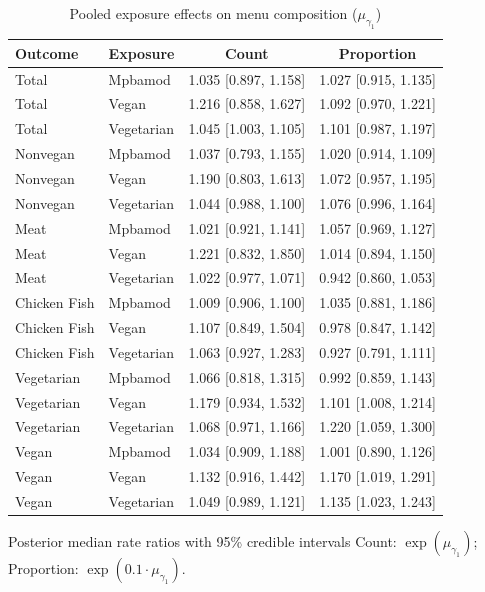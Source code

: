 \begin{table}[H]
\centering
\caption{Pooled exposure effects on menu composition ($\mu_{\gamma_1}$)}
\label{tab:a1_mu_gamma}
\begin{tabular}{llcc}
\toprule
Outcome & Exposure & Count & Proportion \\
\midrule
Total & Mpbamod & 1.035 [0.897, 1.158] & 1.027 [0.915, 1.135] \\
Total & Vegan & 1.216 [0.858, 1.627] & 1.092 [0.970, 1.221] \\
Total & Vegetarian & 1.045 [1.003, 1.105] & 1.101 [0.987, 1.197] \\
Nonvegan & Mpbamod & 1.037 [0.793, 1.155] & 1.020 [0.914, 1.109] \\
Nonvegan & Vegan & 1.190 [0.803, 1.613] & 1.072 [0.957, 1.195] \\
Nonvegan & Vegetarian & 1.044 [0.988, 1.100] & 1.076 [0.996, 1.164] \\
Meat & Mpbamod & 1.021 [0.921, 1.141] & 1.057 [0.969, 1.127] \\
Meat & Vegan & 1.221 [0.832, 1.850] & 1.014 [0.894, 1.150] \\
Meat & Vegetarian & 1.022 [0.977, 1.071] & 0.942 [0.860, 1.053] \\
Chicken Fish & Mpbamod & 1.009 [0.906, 1.100] & 1.035 [0.881, 1.186] \\
Chicken Fish & Vegan & 1.107 [0.849, 1.504] & 0.978 [0.847, 1.142] \\
Chicken Fish & Vegetarian & 1.063 [0.927, 1.283] & 0.927 [0.791, 1.111] \\
Vegetarian & Mpbamod & 1.066 [0.818, 1.315] & 0.992 [0.859, 1.143] \\
Vegetarian & Vegan & 1.179 [0.934, 1.532] & 1.101 [1.008, 1.214] \\
Vegetarian & Vegetarian & 1.068 [0.971, 1.166] & 1.220 [1.059, 1.300] \\
Vegan & Mpbamod & 1.034 [0.909, 1.188] & 1.001 [0.890, 1.126] \\
Vegan & Vegan & 1.132 [0.916, 1.442] & 1.170 [1.019, 1.291] \\
Vegan & Vegetarian & 1.049 [0.989, 1.121] & 1.135 [1.023, 1.243] \\
\bottomrule
\end{tabular}
\par\smallskip\footnotesize Posterior median rate ratios with 95\% credible intervals Count: $\exp(\mu_{\gamma_1})$; Proportion: $\exp(0.1 \cdot \mu_{\gamma_1})$.
\end{table}

